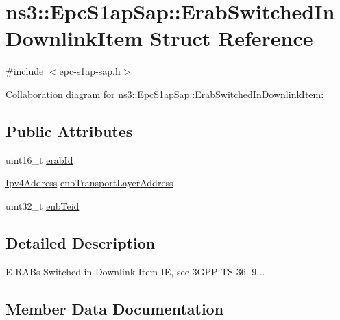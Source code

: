 \hypertarget{structns3_1_1EpcS1apSap_1_1ErabSwitchedInDownlinkItem}{}\section{ns3\+:\+:Epc\+S1ap\+Sap\+:\+:Erab\+Switched\+In\+Downlink\+Item Struct Reference}
\label{structns3_1_1EpcS1apSap_1_1ErabSwitchedInDownlinkItem}


{\ttfamily \#include $<$epc-\/s1ap-\/sap.\+h$>$}



Collaboration diagram for ns3\+:\+:Epc\+S1ap\+Sap\+:\+:Erab\+Switched\+In\+Downlink\+Item\+:
\subsection*{Public Attributes}
\begin{DoxyCompactItemize}
\item 
uint16\+\_\+t \hyperlink{structns3_1_1EpcS1apSap_1_1ErabSwitchedInDownlinkItem_aa3b67cf8a0630fe9e66ddc8c8a87baa5}{erab\+Id}
\item 
\hyperlink{classns3_1_1Ipv4Address}{Ipv4\+Address} \hyperlink{structns3_1_1EpcS1apSap_1_1ErabSwitchedInDownlinkItem_a34d411f0905fbc3c9eb0eb52ba93c086}{enb\+Transport\+Layer\+Address}
\item 
uint32\+\_\+t \hyperlink{structns3_1_1EpcS1apSap_1_1ErabSwitchedInDownlinkItem_a3e3f7e49c08335d7d61434c0f62832dc}{enb\+Teid}
\end{DoxyCompactItemize}


\subsection{Detailed Description}
E-\/\+R\+A\+Bs Switched in Downlink Item IE, see 3\+G\+PP TS 36. 9... 

\subsection{Member Data Documentation}
